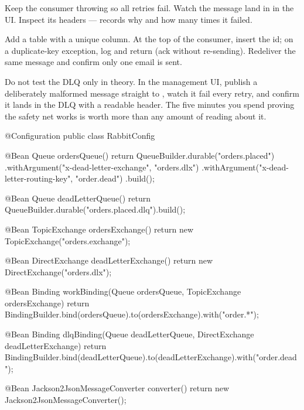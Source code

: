 Keep the consumer throwing so all retries fail. Watch the message land in  in the UI. Inspect its headers ---  records why and how many times it failed.

Add a  table with a unique  column. At the top of the consumer, insert the id; on a duplicate-key exception, log and return (ack without re-sending). Redeliver the same message and confirm only one email is sent.

\begin{prodtip}
Do not test the DLQ only in theory. In the management UI, publish a deliberately malformed message straight to , watch it fail every retry, and confirm it lands in the DLQ with a readable  header. The five minutes you spend proving the safety net works is worth more than any amount of reading about it.
\end{prodtip}

\begin{javabox}
@Configuration
public class RabbitConfig {

  @Bean
  Queue ordersQueue() {
    return QueueBuilder.durable("orders.placed")
        .withArgument("x-dead-letter-exchange", "orders.dlx")
        .withArgument("x-dead-letter-routing-key", "order.dead")
        .build();
  }

  @Bean
  Queue deadLetterQueue() {
    return QueueBuilder.durable("orders.placed.dlq").build();
  }

  @Bean
  TopicExchange ordersExchange() { return new TopicExchange("orders.exchange"); }

  @Bean
  DirectExchange deadLetterExchange() { return new DirectExchange("orders.dlx"); }

  @Bean
  Binding workBinding(Queue ordersQueue, TopicExchange ordersExchange) {
    return BindingBuilder.bind(ordersQueue).to(ordersExchange).with("order.*");
  }

  @Bean
  Binding dlqBinding(Queue deadLetterQueue, DirectExchange deadLetterExchange) {
    return BindingBuilder.bind(deadLetterQueue).to(deadLetterExchange).with("order.dead");
  }

  @Bean
  Jackson2JsonMessageConverter converter() {
    return new Jackson2JsonMessageConverter();
  }
}
\end{javabox}

